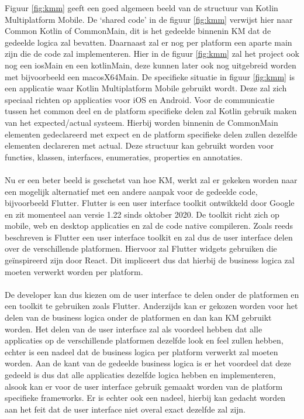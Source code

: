 Figuur \ref{fig:kmm} geeft een goed algemeen beeld van de structuur van Kotlin Multiplatform Mobile. De ‘shared code’ in de figuur \ref{fig:kmm} verwijst hier naar Common Kotlin of CommonMain, dit is het gedeelde binnenin KM dat de gedeelde logica zal bevatten. Daarnaast zal er nog per platform een aparte main zijn die de code zal implementeren. Hier in de figuur \ref{fig:kmm} zal het project ook nog een iosMain en een kotlinMain, deze kunnen later ook nog uitgebreid worden met bijvoorbeeld een macosX64Main. De specifieke situatie in figuur \ref{fig:kmm} is een applicatie waar Kotlin Multiplatform Mobile gebruikt wordt. Deze zal zich speciaal richten op applicaties voor iOS en Android.
Voor de communicatie tussen het common deel en de platform specifieke delen zal Kotlin gebruik maken van het expected/actual systeem. Hierbij worden binnenin de CommonMain elementen gedeclareerd met expect en de platform specifieke delen zullen dezelfde elementen declareren met actual. Deze structuur kan gebruikt worden voor functies, klassen, interfaces, enumeraties, properties en annotaties. 
\\
\\
Nu er een beter beeld is geschetst van hoe KM, werkt zal er gekeken worden naar een mogelijk alternatief met een andere aanpak voor de gedeelde code, bijvoorbeeld Flutter. Flutter is een user interface toolkit ontwikkeld door Google en zit momenteel aan versie 1.22 sinds oktober 2020.\autocite{Sells2020} De toolkit richt zich op mobile, web en desktop applicaties en zal de code native compileren. Zoals reeds beschreven is Flutter een user interface toolkit en zal dus de user interface delen over de verschillende platformen. Hiervoor zal Flutter widgets gebruiken die geïnspireerd zijn door React.\autocite{FlutterWidgets} Dit impliceert dus dat hierbij de business logica zal moeten verwerkt worden per platform.
\\
\\
De developer kan dus kiezen om de user interface te delen onder de platformen en een toolkit te gebruiken zoals Flutter. Anderzijds kan er gekozen worden voor het delen van de business logica onder de platformen en dan kan KM gebruikt worden. Het delen van de user interface zal als voordeel hebben dat alle applicaties op de verschillende platformen dezelfde look en feel zullen hebben, echter is een nadeel dat de business logica per platform verwerkt zal moeten worden. Aan de kant van de gedeelde business logica is er het voordeel dat deze gedeeld is dus dat alle applicaties dezelfde logica hebben en implementeren, alsook kan er voor de user interface gebruik gemaakt worden van de platform specifieke frameworks. Er is echter ook een nadeel, hierbij kan gedacht worden aan het feit dat de user interface niet overal exact dezelfde zal zijn. 


